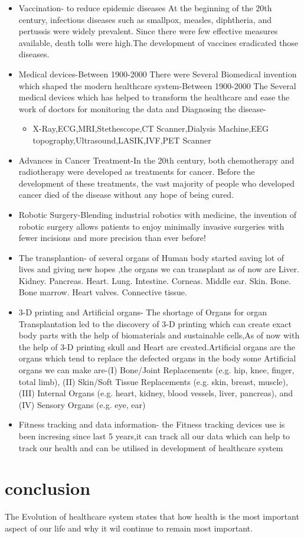 \documentclass[12pt]{article}
\begin{document}
\begin{itemize}
\item Vaccination- to reduce epidemic diseases At the beginning of the 20th century, infectious diseases such as smallpox, measles, diphtheria, and pertussis were widely prevalent. Since there were few effective measures available, death tolls were high.The development of vaccines eradicated those diseases.
\item Medical devices-Between 1900-2000 There  were Several Biomedical invention which shaped the modern healthcare system-Between 1900-2000 The Several medical devices which has helped to transform the healthcare and ease the work of doctors for monitoring the data and Diagnosing the disease-
\begin{itemize}
\item X-Ray,ECG,MRI,Stethescope,CT Scanner,Dialysis Machine,EEG topography,Ultrasound,LASIK,IVF,PET Scanner
\end{itemize}
\item Advances in Cancer Treatment-In the 20th century, both chemotherapy and radiotherapy were developed as treatments for cancer. Before the development of these treatments, the vast majority of people who developed cancer died of the disease without any hope of being cured.
\item Robotic Surgery-Blending industrial robotics with medicine, the invention of robotic surgery allows patients to enjoy minimally invasive surgeries with fewer incisions and more precision than ever before!

\item The transplantion- of several organs of Human body started saving  lot of lives and giving new hopes ,the organs we can transplant as of now are Liver.
Kidney.
Pancreas.
Heart.
Lung.
Intestine.
Corneas.
Middle ear.
Skin.
Bone.
Bone marrow.
Heart valves.
Connective tissue.
\item 3-D printing and Artificial organs- The shortage of Organs for organ Transplantation led to the discovery of  3-D printing which can create exact body parts with the help of biomaterials and sustainable cells,As of now with the help of 3-D printing skull and Heart are created.Artificial organs are the organs which tend to replace the defected organs in the body some Artificial organs we can make are-(I) Bone/Joint Replacements (e.g. hip, knee, finger, total limb), (II) Skin/Soft Tissue Replacements (e.g. skin, breast, muscle), (III) Internal Organs (e.g. heart, kidney, blood vessels, liver, pancreas), and (IV) Sensory Organs (e.g. eye, ear)
\item Fitness tracking and data information- the Fitness tracking devices use is been incresing since last 5 years,it can track all our data which can help to track our health and can be utilised in development of healthcare system
\end{itemize}

\section{conclusion}
The Evolution of healthcare system states that how health is the most important aspect of our life and why it wil continue to remain most important.
\end{document}
